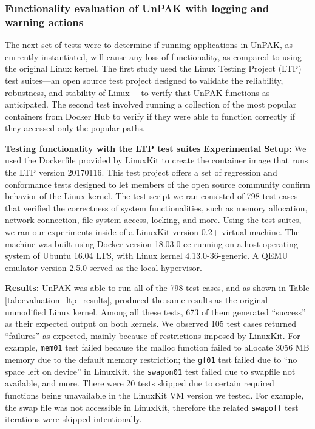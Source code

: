 \subsubsection{Functionality evaluation of UnPAK with logging and warning actions}
\label{sec.evaluation.3.1} 
The next set of tests were to determine if  running applications in UnPAK, as currently instantiated, will cause any loss of functionality, as compared to using the original Linux kernel. 
The first study used the Linux Testing Project (LTP) \cite{LTP} test suites—an open source test project designed to validate the reliability, robustness, and stability of Linux—
to verify that  UnPAK functions as anticipated. The second test involved running a collection of the most popular containers from Docker Hub to verify if they were able to function correctly if they accessed only the popular paths.

\noindent
\textbf{Testing functionality with the LTP test suites} 
\newline
\textbf{Experimental Setup:} We used the Dockerfile provided by LinuxKit \cite{LinuxKit} to create the container image that runs the LTP version 20170116. 
This test project offers a set of regression and conformance tests designed to let members of the open source community confirm behavior of the Linux kernel. 
The test script we ran consisted of 798 test cases that verified the correctness of system functionalities, such as memory allocation, network connection, file system access, locking, and more. Using the test suites, we ran our experiments inside of a LinuxKit version 0.2+ virtual machine. 
The machine was built using Docker version 18.03.0-ce running on a host operating system of Ubuntu 16.04 LTS, with Linux kernel 4.13.0-36-generic. 
A QEMU emulator version 2.5.0 served as the local hypervisor. 

\textbf{Results:} UnPAK was able to run all of the 798 test cases, and as shown in Table \ref{tab:evaluation_ltp_results}, produced the same results as the original unmodified Linux kernel. 
Among all these tests, 673 of them generated “success” as their expected output on both kernels. We observed 105 test cases returned ``failures'' as expected, 
mainly because of restrictions imposed by LinuxKit. For example, \texttt{mem01} test failed because the malloc function failed to allocate 3056 MB memory due to the default memory restriction; 
the \texttt{gf01} test failed due to ``no space left on device'' in LinuxKit. the \texttt{swapon01} test failed due to swapfile not available, and more. 
There were 20 tests skipped due to certain required functions being unavailable in the LinuxKit VM version we tested. For example, the swap file was not accessible in LinuxKit, 
therefore the related \texttt{swapoff} test iterations were skipped intentionally.

